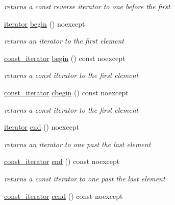 \begin{DoxyCompactItemize}
\begin{DoxyCompactList}\small\item\em returns a const reverse iterator to one before the first \end{DoxyCompactList}\item 
\hyperlink{classnlohmann_1_1basic__json_1_1iterator}{iterator} \hyperlink{classnlohmann_1_1basic__json_ad4e381c54039607be08d7af41a1f6ad1}{begin} () noexcept
\begin{DoxyCompactList}\small\item\em returns an iterator to the first element \end{DoxyCompactList}\item 
\hyperlink{classnlohmann_1_1basic__json_1_1const__iterator}{const\-\_\-iterator} \hyperlink{classnlohmann_1_1basic__json_af9587bc58ebfac62b2c6b08799f57c2f}{begin} () const noexcept
\begin{DoxyCompactList}\small\item\em returns a const iterator to the first element \end{DoxyCompactList}\item 
\hyperlink{classnlohmann_1_1basic__json_1_1const__iterator}{const\-\_\-iterator} \hyperlink{classnlohmann_1_1basic__json_a7355a41b0033ff8a27d58550544d5a59}{cbegin} () const noexcept
\begin{DoxyCompactList}\small\item\em returns a const iterator to the first element \end{DoxyCompactList}\item 
\hyperlink{classnlohmann_1_1basic__json_1_1iterator}{iterator} \hyperlink{classnlohmann_1_1basic__json_a12ccf14d39ddae52f6c7e126105a230b}{end} () noexcept
\begin{DoxyCompactList}\small\item\em returns an iterator to one past the last element \end{DoxyCompactList}\item 
\hyperlink{classnlohmann_1_1basic__json_1_1const__iterator}{const\-\_\-iterator} \hyperlink{classnlohmann_1_1basic__json_abd7e95159740e94160c13392b1536eb1}{end} () const noexcept
\begin{DoxyCompactList}\small\item\em returns a const iterator to one past the last element \end{DoxyCompactList}\item 
\hyperlink{classnlohmann_1_1basic__json_1_1const__iterator}{const\-\_\-iterator} \hyperlink{classnlohmann_1_1basic__json_aa730d68d55ccc48d2cd4835ff46d2a0f}{cend} () const noexcept

\end{DoxyCompactItemize}

